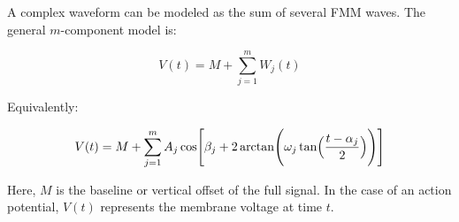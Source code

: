 \documentclass[a4paper]{article}
\begin{document}
            A complex waveform can be modeled as the sum of several FMM waves.
            The general $m$-component model is:
            
            \begin{equation}
                V(t)
                =
                M
                +
                \sum_{j=1}^{m}
                W_j(t)
            \end{equation}
            
            Equivalently:
            
            \begin{equation}
                V(t)
                =
                M
                +
                \sum_{j=1}^{m}
                A_j
                \cos
                \Biggl[
                    \beta_j
                    +
                    2
                    \arctan
                    \Biggl(
                    \omega_j
                    \tan
                    \Bigl(
                    \frac{t-\alpha_j}{2}
                    \Bigr)
                    \Biggr)
                    \Biggr]
            \end{equation}
            
            Here, $M$ is the baseline or vertical offset of the full signal.
            In the case of an action potential, $V(t)$ represents the membrane voltage at time $t$.
            
            
            
\end{document}
